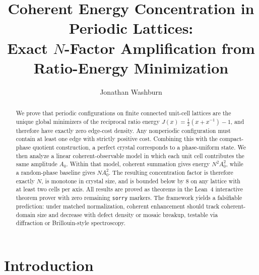 \documentclass[prb,twocolumn,nofootinbib,superscriptaddress]{revtex4-2}
\newcommand{\J}{J}
\begin{document}
\title{Coherent Energy Concentration in Periodic Lattices:\\
Exact $N$-Factor Amplification from Ratio-Energy Minimization}

\author{Jonathan Washburn}

\begin{abstract}
We prove that periodic configurations on finite connected unit-cell lattices are the unique global minimizers of the reciprocal ratio energy $\J(x)=\frac12(x+x^{-1})-1$, and therefore have exactly zero edge-cost density.
Any nonperiodic configuration must contain at least one edge with strictly positive cost.
Combining this with the compact-phase quotient construction, a perfect crystal corresponds to a phase-uniform state.
We then analyze a linear coherent-observable model in which each unit cell contributes the same amplitude $A_0$.
Within that model, coherent summation gives energy $N^2 A_0^2$, while a random-phase baseline gives $N A_0^2$.
The resulting concentration factor is therefore exactly $N$, is monotone in crystal size, and is bounded below by $8$ on any lattice with at least two cells per axis.
All results are proved as theorems in the Lean~4 interactive theorem prover with zero remaining \texttt{sorry} markers.
The framework yields a falsifiable prediction: under matched normalization, coherent enhancement should track coherent-domain size and decrease with defect density or mosaic breakup, testable via diffraction or Brillouin-style spectroscopy.
\end{abstract}

\maketitle

\section{Introduction}
\label{sec:intro}
\end{document}
